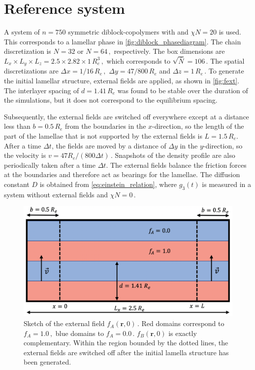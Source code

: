 \documentclass[bachelor,       %
               oneside,        %
               BCOR10mm,       %
               ngerman, english %
               ]{GAUBM}
\begin{document}
\section{Reference system}
A system of $n=750$ symmetric diblock-copolymers with and $\chi N=20$ is used. This corresponds to a lamellar phase in \autoref{fig:diblock_phasediagram}. The chain discretization is $N=32$ or $N=64\,,$ respectively. The box dimensions are $L_x\times L_y\times L_z=2.5\times2.82\times1\,R_e^3\,,$ which corresponds to $\sqrt{\bar{N}}=106\,.$ The spatial discretizations are $\Delta x=1/16\,R_e\,,$ $\Delta y=47/800\,R_e$ and $\Delta z=1\,R_e\,.$ To generate the initial lamellar structure, external fields are applied, as shown in \autoref{fig:fext}. The interlayer spacing of $d=1.41\,R_e$ was found to be stable over the duration of the simulations, but it does not correspond to the equilibrium spacing.

Subsequently, the external fields are switched off everywhere except at a distance less than $b=0.5\,R_e$ from the boundaries in the $x$-direction, so the length of the part of the lamellae that is not supported by the external fields is $L=1.5\,R_e$. After a time $\Delta t$, the fields are moved by a distance of $\Delta y$ in the $y$-direction, so the velocity is $v=47R_e/(800\Delta t)\,.$ Snapshots of the density profile are also periodically taken after a time $\Delta t$. The external fields balance the friction forces at the boundaries and therefore act as bearings for the lamellae. The diffusion constant $D$ is obtained from \autoref{eq:einstein_relation}, where $g_3(t)$ is measured in a system without external fields and $\chi N=0\,.$

\begin{figure}[h]
    \centering
    \includegraphics[width=0.6\linewidth]{figures/fext.png}
    \caption{Sketch of the external field $f_A(\mathbf r,0)\,.$ Red domains correspond to $f_A=1.0\,,$ blue domains to $f_A=0.0\,.$ $f_B(\mathbf r,0)$ is exactly complementary. Within the region bounded by the dotted lines, the external fields are switched off after the initial lamella structure has been generated.}
    \label{fig:fext}
\end{figure}
\end{document}
